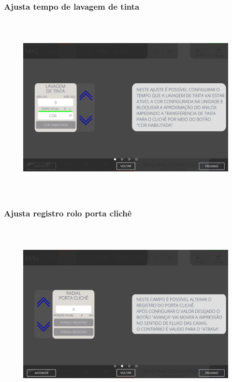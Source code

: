 \subsubsection{\small{Ajusta tempo de lavagem de tinta}}
\begin{figure}[h]
  \centering
  \includegraphics[width=576px,height=360px]{src/imagesFlexo/04-printter/02-printter/settings/e-1.png}
\end{figure}
\vspace*{\fill}

\newpage
\thispagestyle{fancy}
\vspace*{\fill}
\subsubsection{\small{Ajusta registro rolo porta clichê}}
\begin{figure}[h]
  \centering
  \includegraphics[width=576px,height=360px]{src/imagesFlexo/04-printter/02-printter/settings/e-2.png}
\end{figure}
\vspace*{\fill}

